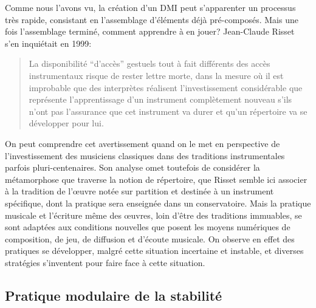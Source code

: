 \noindent Comme nous l'avons vu, la création d'un \gls{DMI} peut s'apparenter un processus très rapide, consistant en l'assemblage d'éléments déjà pré-composés. Mais une fois l'assemblage terminé, comment apprendre à en jouer? Jean-Claude Risset s'en inquiétait en 1999: 
\blockquote{La disponibilité ``d'accès'' gestuels tout à fait différents des accès instrumentaux risque de rester lettre morte, dans la mesure où il est improbable que des interprètes réalisent l'investissement considérable que représente l'apprentissage d'un instrument complètement nouveau s'ils n'ont pas l'assurance que cet instrument va durer et qu'un répertoire va se développer pour lui.\cite{risset_nouveaux_1999}}
\noindent On peut comprendre cet avertissement quand on le met en perspective de l'investissement des musiciens classiques dans des traditions instrumentales parfois pluri-centenaires. Son analyse omet toutefois de considérer la métamorphose que traverse la notion de répertoire, que Risset semble ici associer à la tradition de l'œuvre notée sur partition et destinée à un instrument spécifique, dont la pratique sera enseignée dans un conservatoire. Mais la pratique musicale et l'écriture même des œuvres, loin d'être des traditions immuables, se sont adaptées aux conditions nouvelles que posent les moyens numériques de composition, de jeu, de diffusion et d'écoute musicale. On observe en effet des pratiques se développer, malgré cette situation incertaine et instable, et diverses stratégies s'inventent pour faire face à cette situation.

\subsection{Pratique modulaire de la stabilité}

